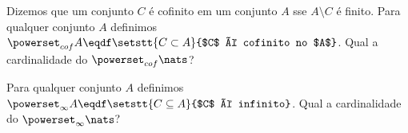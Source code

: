 \begin{exercise}
    Dizemos que um conjunto $C$ é cofinito em um conjunto $A$ sse $A \setminus C$ é finito.
    Para qualquer conjunto $A$ definimos $\powerset_{cof} A \eqdf \setstt{C \subset A}{$C$ é cofinito no $A$}$.
    Qual a cardinalidade do $\powerset_{cof} \nats$?
\end{exercise}

\begin{exercise}
	Para qualquer conjunto $A$ definimos $\powerset_\infty A \eqdf \setstt{C \subseteq A}{$C$ é infinito}$.
	Qual a cardinalidade do $\powerset_\infty \nats$?
\end{exercise}